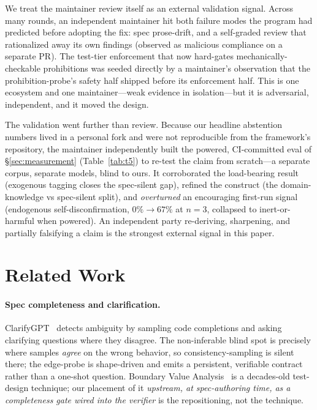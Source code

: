 \documentclass[11pt]{article}
\begin{document}
We treat the maintainer review itself as an external validation signal. Across many rounds, an
independent maintainer hit both failure modes the program had predicted before adopting the fix: spec
prose-drift, and a self-graded review that rationalized away its own findings (observed as malicious
compliance on a separate PR). The test-tier enforcement that now hard-gates mechanically-checkable
prohibitions was seeded directly by a maintainer's observation that the prohibition-probe's safety
half shipped before its enforcement half. This is one ecosystem and one maintainer---weak evidence in
isolation---but it is adversarial, independent, and it moved the design.

The validation went further than review. Because our headline abstention numbers lived in a personal
fork and were not reproducible from the framework's repository, the maintainer independently built the
powered, CI-committed eval of \S\ref{sec:measurement} (Table~\ref{tab:t5}) to re-test the claim from
scratch---a separate corpus, separate models, blind to ours. It corroborated the load-bearing result
(exogenous tagging closes the spec-silent gap), refined the construct (the domain-knowledge vs
spec-silent split), and \emph{overturned} an encouraging first-run signal (endogenous
self-disconfirmation, $0\%\!\to\!67\%$ at $n=3$, collapsed to inert-or-harmful when powered). An
independent party re-deriving, sharpening, and partially falsifying a claim is the strongest external
signal in this paper.

\section{Related Work}
\label{sec:related}

\paragraph{Spec completeness and clarification.}
ClarifyGPT~\cite{clarifygpt} detects ambiguity by sampling code completions and asking clarifying
questions where they disagree. The non-inferable blind spot is precisely where samples \emph{agree}
on the wrong behavior, so consistency-sampling is silent there; the edge-probe is shape-driven and
emits a persistent, verifiable contract rather than a one-shot question. Boundary Value
Analysis~\cite{myers2011art} is a decades-old test-design technique; our placement of it
\emph{upstream, at spec-authoring time, as a completeness gate wired into the verifier} is the
repositioning, not the technique.
\end{document}
